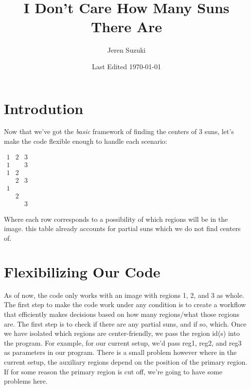 \documentclass[10pt]{scrartcl}
\title{I Don't Care How Many Suns There Are}
\author{Jeren Suzuki}
\date{Last Edited \today}
\begin{document}
\maketitle
{}
\tableofcontents
\clearpage
{}

\section{Introdution} %
\label{sec:introdution}
    Now that we've got the \emph{basic} framework of finding the centers of 3 suns, let's make the code flexible enough to handle each scenario:\\
\begin{center}
    $\begin{matrix} 
    1 & 2 & 3 \\ 
    1 &   & 3 \\
    1 & 2 &   \\
      & 2 & 3 \\
    1 &   &   \\
      & 2 &   \\
      &   & 3
    \end{matrix}$
\end{center}

Where each row corresponds to a possibility of which regions will be in the image. this table already accounts for partial suns which we do not find centers of. 

\section{Flexibilizing Our Code} %
\label{sec:flexibilizing_our_code}

As of now, the code only works with an image with regions 1, 2, and 3 as whole. The first step to make the code work under any condition is to create a workflow that efficiently makes decisions based on how many regions/what those regions are. The first step is to check if there are any partial suns, and if so, which. Once we have isolated which regions are center-friendly, we pass the region id(s) into the program. For example, for our current setup, we'd pass reg1, reg2, and reg3 as parameters in our program. There is a small problem however where in the current setup, the auxiliary regions depend on the position of the primary region. If for some reason the primary region is cut off, we're going to have some problems here.
\end{document}
